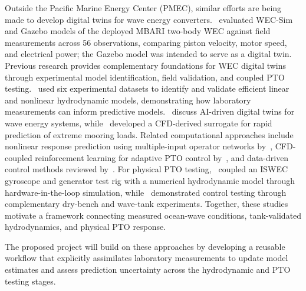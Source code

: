 \documentclass[11pt]{article}
\begin{document}
Outside the Pacific Marine Energy Center (PMEC), similar efforts are being made to develop digital twins for wave energy converters.~\cite{Dizon2024FieldValidation} evaluated WEC-Sim and Gazebo models of the deployed MBARI two-body WEC against field measurements across 56 observations, comparing piston velocity, motor speed, and electrical power; the Gazebo model was intended to serve as a digital twin. Previous research provides complementary foundations for WEC digital twins through experimental model identification, field validation, and coupled PTO testing.~\cite{giorgi_identification_2019} used six experimental  datasets to identify and validate efficient linear and nonlinear hydrodynamic models, demonstrating how laboratory measurements can inform predictive models.~\cite{lawal_ai-driven_2026} discuss AI-driven digital twins for wave energy systems, while~\cite{katsidoniotaki_digital_2022} developed a CFD-derived surrogate for rapid prediction of extreme mooring loads. Related computational approaches include nonlinear response prediction using multiple-input operator networks by~\cite{zhang_multiple-input_2025}, CFD-coupled reinforcement learning for adaptive PTO control by~\cite{liang_environmental-sensing_2024}, and data-driven control methods reviewed by~\cite{pasta_towards_2023}. 
For physical PTO testing,~\cite{Bracco2015ISWECHIL} coupled an ISWEC gyroscope and generator test rig with a numerical hydrodynamic model through hardware-in-the-loop simulation, while~\cite{Bacelli2019TankBench} demonstrated control testing through complementary dry-bench and wave-tank experiments. Together, these studies motivate a framework connecting measured ocean-wave conditions, tank-validated hydrodynamics, and physical PTO response. 

The proposed project will build on these approaches by developing a reusable workflow that explicitly assimilates laboratory measurements to update model estimates and assess prediction uncertainty across the hydrodynamic and PTO testing stages.
\end{document}

